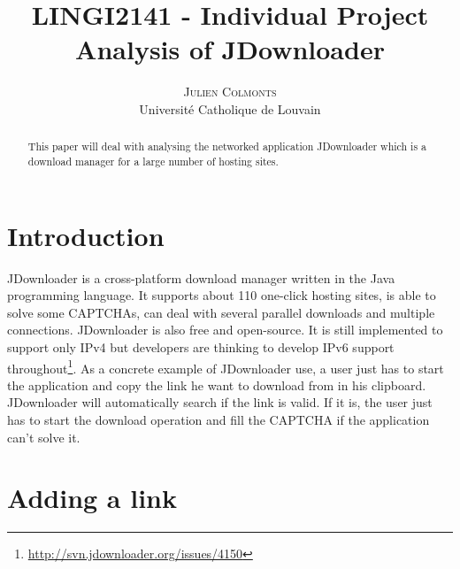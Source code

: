 \documentclass[journal]{IEEEtran}
\title{\vspace{-15mm}\fontsize{24pt}{10pt}\selectfont\textbf{LINGI2141 - Individual Project \\Analysis of JDownloader}} %
\author{
\large
\textsc{Julien Colmonts}\\[2mm] %
\normalsize Université Catholique de Louvain \\ %
\vspace{-5mm}
}
\date{}
\begin{document}
\maketitle %

\thispagestyle{fancy} %


\begin{abstract}

This paper will deal with analysing the networked application JDownloader which is a download manager for a large number of hosting sites.

\end{abstract}



\section{Introduction}

\lettrine[nindent=0em,lines=3]{J} Downloader is a cross-platform download manager written in the Java programming language. It supports about 110 one-click hosting sites, is able to solve some CAPTCHAs, can deal with several parallel downloads and multiple connections. JDownloader is also free and open-source. It is still implemented to support only IPv4 but developers are thinking to develop IPv6 support throughout\footnote{\url{http://svn.jdownloader.org/issues/4150}}. As a concrete example of JDownloader use, a user just has to start the application and copy the link he want to download from in his clipboard. JDownloader will automatically search if the link is valid. If it is, the user just has to start the download operation and fill the CAPTCHA if the application can't solve it. 


\section{Adding a link}

\end{document}
